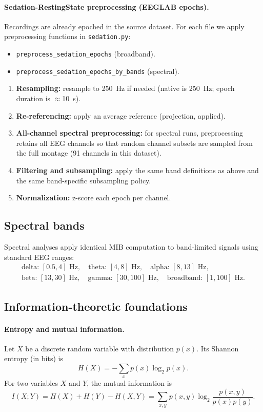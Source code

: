 \documentclass[11pt]{article}
\begin{document}
\paragraph{Sedation-RestingState preprocessing (EEGLAB epochs).}
Recordings are already epoched in the source dataset. For each file we apply preprocessing functions in \texttt{sedation.py}:
\begin{itemize}[leftmargin=*]
    \item \texttt{preprocess\_sedation\_epochs} (broadband).
    \item \texttt{preprocess\_sedation\_epochs\_by\_bands} (spectral).
\end{itemize}
\begin{enumerate}[leftmargin=*]
    \item \textbf{Resampling:} resample to \SI{250}{Hz} if needed (native is \SI{250}{Hz}; epoch duration is $\approx$\SI{10}{s}).
    \item \textbf{Re-referencing:} apply an average reference (projection, applied).
    \item \textbf{All-channel spectral preprocessing:} for spectral runs, preprocessing retains all EEG channels so that random channel subsets are sampled from the full montage (91 channels in this dataset).
    \item \textbf{Filtering and subsampling:} apply the same band definitions as above and the same band-specific subsampling policy.
    \item \textbf{Normalization:} z-score each epoch per channel.
\end{enumerate}

\subsection{Spectral bands}
Spectral analyses apply identical MIB computation to band-limited signals using standard EEG ranges:
\begin{align*}
\text{delta: }[0.5,4]\text{ Hz},\quad
\text{theta: }[4,8]\text{ Hz},\quad
\text{alpha: }[8,13]\text{ Hz},\\
\text{beta: }[13,30]\text{ Hz},\quad
\text{gamma: }[30,100]\text{ Hz},\quad
\text{broadband: }[1,100]\text{ Hz}.
\end{align*}

\subsection{Information-theoretic foundations}
\paragraph{Entropy and mutual information.}
Let $X$ be a discrete random variable with distribution $p(x)$. Its Shannon entropy (in bits) is
\begin{equation}
H(X) = -\sum_{x} p(x)\log_{2} p(x).
\label{eq:entropy}
\end{equation}
For two variables $X$ and $Y$, the mutual information is
\begin{equation}
I(X;Y) = H(X) + H(Y) - H(X,Y)
= \sum_{x,y} p(x,y)\log_{2}\frac{p(x,y)}{p(x)p(y)}.
\label{eq:mi}
\end{equation}
\end{document}
